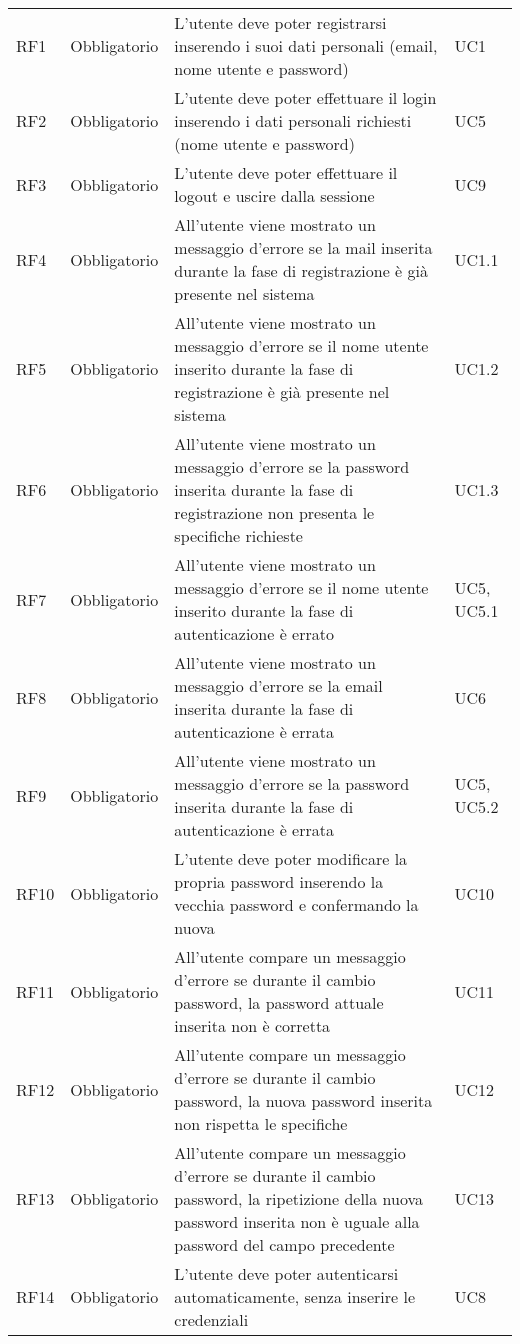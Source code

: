 {\begin{longtable}{C{.15\freewidth} C{.2\freewidth} C{.528\freewidth} C{.15\freewidth}}
      RF1 & Obbligatorio & L'utente deve poter registrarsi inserendo i suoi dati personali (email, nome utente e password) & UC1 \\
      RF2 & Obbligatorio & L'utente deve poter effettuare il login inserendo i dati personali richiesti (nome utente e password) & UC5 \\
      RF3 & Obbligatorio & L'utente deve poter effettuare il logout e uscire dalla sessione & UC9 \\
      RF4 & Obbligatorio & All'utente viene mostrato un messaggio d'errore se la mail inserita durante la fase di registrazione è già presente nel sistema  & UC1.1 \\
      RF5 & Obbligatorio & All'utente viene mostrato un messaggio d'errore se il nome utente inserito durante la fase di registrazione è già presente nel sistema & UC1.2 \\
      RF6 & Obbligatorio & All'utente viene mostrato un messaggio d'errore se la password inserita durante la fase di registrazione non presenta le specifiche richieste & UC1.3 \\
      RF7 & Obbligatorio & All'utente viene mostrato un messaggio d'errore se il nome utente inserito durante la fase di autenticazione è errato & UC5, UC5.1 \\
      RF8 & Obbligatorio & All'utente viene mostrato un messaggio d'errore se la email inserita durante la fase di autenticazione è errata & UC6\\
      RF9 & Obbligatorio & All'utente viene mostrato un messaggio d'errore se la password inserita durante la fase di autenticazione è errata & UC5, UC5.2 \\
      RF10 & Obbligatorio & L'utente deve poter modificare la propria password inserendo la vecchia password e confermando la nuova & UC10 \\
      RF11 & Obbligatorio & All'utente compare un messaggio d'errore se durante il cambio password, la password attuale inserita non è corretta & UC11 \\
      RF12 & Obbligatorio & All'utente compare un messaggio d'errore se durante il cambio password, la nuova password inserita non rispetta le specifiche & UC12 \\
      RF13 & Obbligatorio & All'utente compare un messaggio d'errore se durante il cambio password, la ripetizione della nuova password inserita non è uguale alla password del campo precedente & UC13 \\
      RF14 & Obbligatorio & L'utente deve poter autenticarsi automaticamente, senza inserire le credenziali & UC8\\

\end{longtable}}

